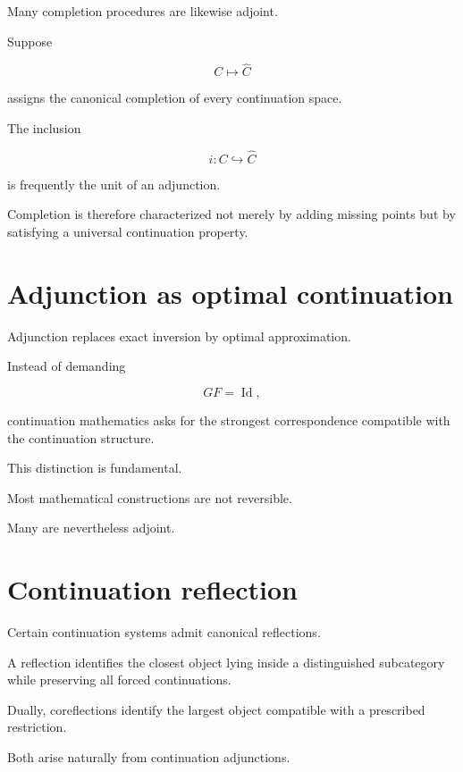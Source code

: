 \documentclass[13pt,openany]{book}
\theoremstyle{plain}
\theoremstyle{definition}
\begin{document}
Many completion procedures are likewise adjoint.

Suppose

\[
C
\longmapsto
\widehat C
\]

assigns the canonical completion of every continuation space.

The inclusion

\[
i:
C
\hookrightarrow
\widehat C
\]

is frequently the unit of an adjunction.

Completion is therefore characterized not merely by adding missing points but
by satisfying a universal continuation property.

\section{Adjunction as optimal continuation}

Adjunction replaces exact inversion by optimal approximation.

Instead of demanding

\[
GF=\operatorname{Id},
\]

continuation mathematics asks for the strongest correspondence compatible with
the continuation structure.

This distinction is fundamental.

Most mathematical constructions are not reversible.

Many are nevertheless adjoint.

\section{Continuation reflection}

Certain continuation systems admit canonical reflections.

A reflection identifies the closest object lying inside a distinguished
subcategory while preserving all forced continuations.

Dually, coreflections identify the largest object compatible with a prescribed
restriction.

Both arise naturally from continuation adjunctions.
\end{document}
